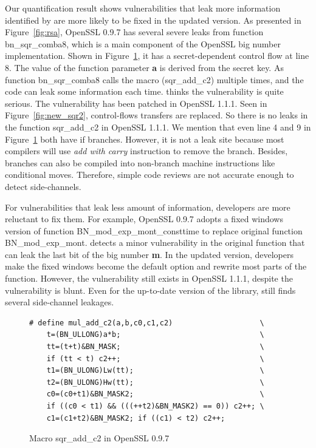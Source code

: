 Our quantification result shows vulnerabilities
that leak more information identified by \tool{} 
are more likely to be fixed in the updated version.
As presented in Figure~\ref{fig:rsa}, 
OpenSSL 0.9.7 has several severe leaks from
function \textsf{bn\_sqr\_comba8}, which is a main 
component of the OpenSSL big number implementation.
Shown in Figure~\ref{fig:old_sqr2}, it has a 
secret-dependent control flow at line 8.
The value of the function parameter \textbf{a} is derived from
the secret key. 
As function \textsf{bn\_sqr\_comba8}
calls the macro (\textsf{sqr\_add\_c2}) multiple times, 
and the code can leak some information each time.
\tool{} thinks the vulnerability is quite serious. 
The vulnerability has been patched in OpenSSL 1.1.1. Seen in 
Figure~\ref{fig:new_sqr2}, control-flows transfers are replaced. 
So there is no leaks in the function
\textsf{sqr\_add\_c2} in OpenSSL 1.1.1. We mention
that even line 4 and 9 in Figure~\ref{fig:old_sqr2} both have if branches.
However, it is not a leak site because
most compilers will use \emph{add with carry} instruction to remove the branch.
Besides, branches can also be compiled into non-branch machine instructions 
like conditional moves. Therefore, simple code reviews are not accurate
enough to detect side-channels. 

For vulnerabilities that leak less amount of information,
developers are more reluctant to fix them. 
For example, OpenSSL 0.9.7 adopts a fixed windows version of 
function \textsf{BN\_mod\_exp\_mont\_consttime} to replace original function
\textsf{BN\_mod\_exp\_mont}.
\tool{} detects a minor vulnerability in the original function that can
leak the last bit of the big number \textbf{m}. In the updated version,
developers make the fixed windows become the default option and rewrite most parts of the 
function. However, the vulnerability still exists in OpenSSL 1.1.1,
despite the vulnerability is blunt. Even for the up-to-date version of the library, 
\tool{} still finds several
side-channel leakages.
\begin{figure}
    \centering
    \begin{lstlisting}[xleftmargin=.02\textwidth,xrightmargin=.01\textwidth]
# define mul_add_c2(a,b,c0,c1,c2)                    \
    t=(BN_ULLONG)a*b;                                \
    tt=(t+t)&BN_MASK;                                \
    if (tt < t) c2++;                                \
    t1=(BN_ULONG)Lw(tt);                             \
    t2=(BN_ULONG)Hw(tt);                             \
    c0=(c0+t1)&BN_MASK2;                             \
    if ((c0 < t1) && (((++t2)&BN_MASK2) == 0)) c2++; \
    c1=(c1+t2)&BN_MASK2; if ((c1) < t2) c2++;
\end{lstlisting}
    \vspace*{-6pt}
    \caption{Macro \textsf{sqr\_add\_c2} in OpenSSL 0.9.7}
    \label{fig:old_sqr2}
    \vspace*{-8pt}
\end{figure}


